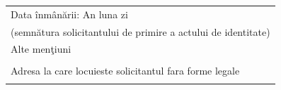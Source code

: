 \documentclass[10pt,a4paper]{article}
\newcommand{\fillline}[1][6cm]{\underline{\hspace{#1}}}
\newcommand{\fillbox}[1][0.4cm]{\framebox[#1]{\rule{0pt}{#1}}}
\begin{document}
\begin{tabularx}{\textwidth}{|m{3cm}|X|}
\multicolumn{2}{|l|}{Data înmânării: \hspace{0.3cm} An \fillbox\fillbox\fillbox\fillbox \hspace{0.3cm} luna \fillbox\fillbox \hspace{0.3cm} zi \fillbox\fillbox \hfill \fillline[5cm]} \\
\multicolumn{2}{|l|}{\hfill \tiny (semnătura solicitantului de primire a actului de identitate)} \\
\hline
\multicolumn{2}{|l|}{Alte menţiuni} \\
\multicolumn{2}{|p{\textwidth}|}{\vspace{1.5cm}} \\
\hline
\multicolumn{2}{|l|}{Adresa la care locuieste solicitantul fara forme legale} \\
\multicolumn{2}{|p{\textwidth}|}{\vspace{1.5cm}} \\
\hline
\end{tabularx}
\end{document}
